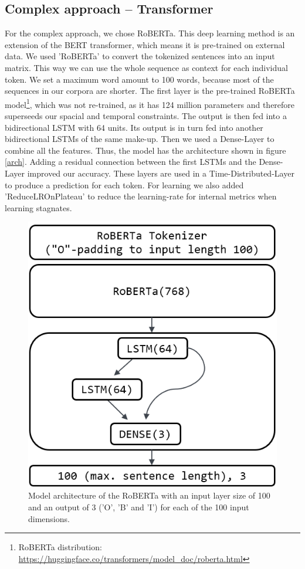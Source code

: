 \documentclass[12pt,pdftex,a4paper]{scrartcl}
\begin{document}
\subsection{Complex approach -- Transformer}
For the complex approach, we chose RoBERTa. This deep learning method is an extension of the BERT transformer, which means it is pre-trained on external data. We used 'RoBERTa' to convert the tokenized sentences into an input matrix. This way we can use the whole sequence as context for each individual token. We set a maximum word amount to 100 words, because most of the sequences in our corpora are shorter. The first layer is the pre-trained RoBERTa model\footnote{RoBERTa distribution: \url{https://huggingface.co/transformers/model_doc/roberta.html}}, which was not re-trained, as it has 124 million parameters and therefore superseeds our spacial and temporal constraints. The output is then fed into a bidirectional LSTM with 64 units. Its output is in turn fed into another bidirectional LSTMs of the same make-up. Then we used a Dense-Layer to combine all the features. Thus, the model has the architecture shown in figure \ref{arch}. Adding a residual connection between the first LSTMs and the Dense-Layer improved our accuracy. These layers are used in a Time-Distributed-Layer to produce a prediction for each token. For learning we also added 'ReduceLROnPlateau' to reduce the learning-rate for internal metrics when learning stagnates.

\begin{figure}
\centering \includegraphics[width=.7\textwidth]{roberta-arch} 

\caption{Model architecture of the RoBERTa with an input layer size of 100 and an output of 3 ('O', 'B' and 'I') for each of the 100 input dimensions.}
\end{figure}
\end{document}
